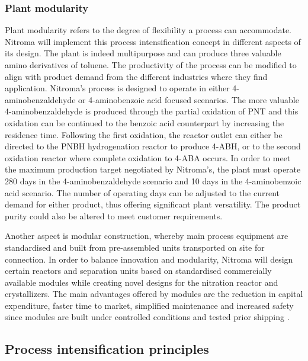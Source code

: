 \subsubsection{Plant modularity} 

Plant modularity refers to the degree of flexibility a process can accommodate. Nitroma will implement this process intensification concept in different aspects of its design. The plant is indeed multipurpose and can produce three valuable amino derivatives of toluene. The productivity of the process can be modified to align with product demand from the different industries where they find application. Nitroma's process is designed to operate in either 4-aminobenzaldehyde or 4-aminobenzoic acid focused scenarios. The more valuable 4-aminobenzaldehyde is produced through the partial oxidation of PNT and this oxidation can be continued to the benzoic acid counterpart by increasing the residence time. Following the first oxidation, the reactor outlet can either be directed to the PNBH hydrogenation reactor to produce 4-ABH, or to the second oxidation reactor where complete oxidation to 4-ABA occurs. In order to meet the maximum production target negotiated by Nitroma's, the plant must operate 280 days in the 4-aminobenzaldehyde scenario and 10 days in the 4-aminobenzoic acid scenario. The number of operating days can be adjusted to the current demand for either product, thus offering significant plant versatility. The product purity could also be altered to meet customer requirements.

Another aspect is modular construction, whereby main process equipment are standardised and built from pre-assembled units transported on site for connection. In order to balance innovation and modularity, Nitroma will design certain reactors and separation units based on standardised commercially available modules while creating novel designs for the nitration reactor and crystallizers. The main advantages offered by modules are the reduction in capital expenditure, faster time to market, simplified maintenance and increased safety since modules are built under controlled conditions and tested prior shipping \cite{baldea_modular_2017}.


\subsection{Process intensification principles}

